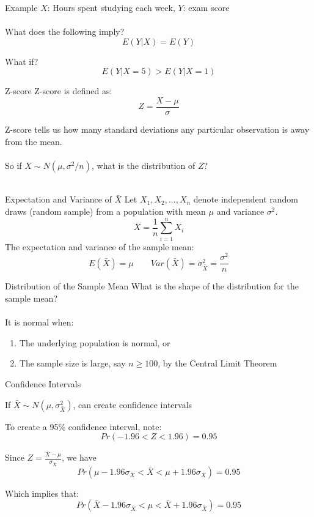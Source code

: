 \documentclass{./../div_teaching_slides}
\begin{document}
\begin{frame}{Example}
$X$: Hours spent studying each week, $Y$: exam score \\~\\
What does the following imply?
$$ E(Y|X) = E(Y)  $$
\vspace{0.1em}

What if?
$$ E(Y|X=5) > E(Y|X=1)  $$
\end{frame}

\begin{frame}{Z-score}
Z-score is defined as:
$$ Z = \frac{X - \mu}{\sigma} $$ 

\vspace{1em}
Z-score tells us how many standard deviations any particular observation is away from the mean. \\~\\
So if $X \sim N(\mu, \sigma^2/n)$, what is the distribution of $Z$? \\~\\
\end{frame}

\begin{frame}{Expectation and Variance of $\bar{X}$}
Let $X_1,X_2,...,X_n$ denote independent random draws (random sample) from a population with mean $\mu$ and variance $\sigma^2$. 
$$ \bar{X} = \frac{1}{n} \sum_{i=1}^n X_i $$
The expectation and variance of the sample mean:
$$E(\bar{X}) = \mu \quad \quad Var(\bar{X}) = \sigma^2_{\bar{X}} = \frac{\sigma^2}{n} $$ 
\end{frame}

\begin{frame}{Distribution of the Sample Mean}
What is the shape of the distribution for the sample mean? \\~\\
It is normal when:
\begin{enumerate}
\item The underlying population is normal, or
\item The sample size is large, say $n\geq 100$, by the Central Limit Theorem 
\end{enumerate}
\end{frame}

\begin{frame}{Confidence Intervals}
\begin{witemize}
  \item If $\bar{X} \sim N(\mu, \sigma^2_{\bar{X}})$, can create confidence intervals
  \item To create a 95\% confidence interval, note:
  $$ Pr(-1.96 < Z < 1.96) = 0.95 $$
  \item Since $Z=\frac{\bar{X} - \mu}{\sigma_{\bar{X}}}$, we have
  $$ Pr(\mu-1.96 \sigma_{\bar{X}} < \bar{X} < \mu + 1.96 \sigma_{\bar{X}}) = 0.95 $$
  \item Which implies that:
  $$ Pr(\bar{X}-1.96 \sigma_{\bar{X}} < \mu < \bar{X} + 1.96 \sigma_{\bar{X}}) = 0.95 $$
\end{witemize}
\end{frame}
\end{document}
